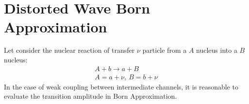 \documentclass[
12pt, %
oneside, %
english, %
onehalfspacing, %
onehalfspacing, %
headsepline, %
]{MastersDoctoralThesis} %
\begin{document}

\section{Distorted Wave Born Approximation}
Let consider the nuclear reaction of transfer $\nu$ particle from a $A$ nucleus into a $B$ nucleus:  
\begin{align}
A+b \rightarrow a + B \nonumber \\
A= a + \nu, ~ B=b+\nu
\end{align}
In the case of weak coupling between intermediate channels, it is reasonable to evaluate the transition amplitude in Born Approximation.
\end{document}
